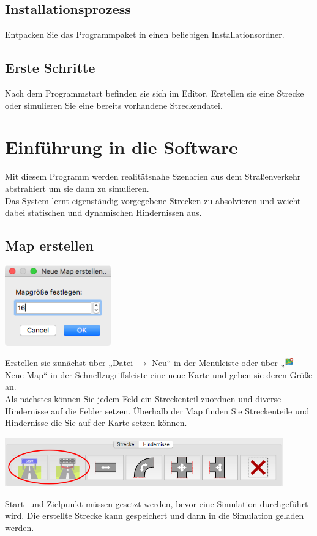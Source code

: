 \documentclass[11pt,a4paper]{article}
\begin{document}
\subsection{Installationsprozess}

Entpacken Sie das Programmpaket in einen beliebigen Installationsordner.

\subsection{Erste Schritte}

Nach dem Programmstart befinden sie sich im Editor. Erstellen sie eine Strecke oder simulieren Sie eine bereits vorhandene Streckendatei.

\newpage
\section{Einführung in die Software}
Mit diesem Programm werden realitätsnahe Szenarien aus dem Straßenverkehr abstrahiert um sie dann zu simulieren. \\
Das System lernt eigenständig vorgegebene Strecken zu absolvieren und weicht dabei statischen und dynamischen Hindernissen aus.

\subsection{Map erstellen}
{
\begin{center}
	\includegraphics[width=130pt]{newMap}
\end{center}
Erstellen sie zunächst über „Datei $\rightarrow$ Neu“ in der Menüleiste oder über „\includegraphics[height=11pt]{icon/new_map} Neue Map“ in der Schnellzugriffsleiste eine neue Karte und geben sie deren Größe an. \\
Als nächstes können Sie jedem Feld ein Streckenteil zuordnen und diverse Hindernisse auf die Felder setzen.
Überhalb der Map finden Sie Streckenteile und Hindernisse die Sie auf der Karte setzen können.\\
\begin{center}
	\includegraphics[width=0.9\textwidth]{s3}
\end{center}

Start- und Zielpunkt müssen gesetzt werden, bevor eine Simulation durchgeführt wird. Die erstellte Strecke kann gespeichert und dann in die Simulation geladen werden. \\
}
\end{document}
